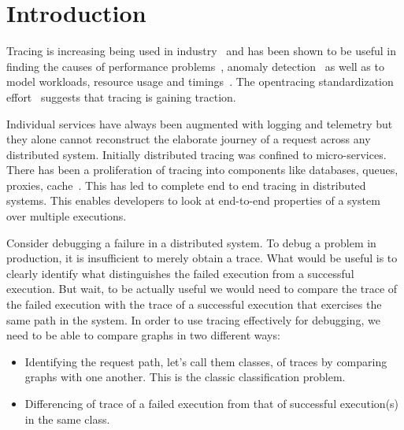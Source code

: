 \section{Introduction}
Tracing is increasing being used in industry~\cite{Jaeger, Zipkin, 36356} and has been shown to be useful in finding the causes of performance problems~\cite{36356, Fonseca:2007:XPN:1973430.1973450, Reynolds:2006:PDU:1267680.1267689, DBLP:conf/sigmetrics/ThereskaSSWALG06, Sambasivan:2011:DPC:1972457.1972463}, anomaly detection~\cite{Barham:2003:MOM:1251054.1251069, Chen:2004:PFE:1251175.1251198, 37477, Sambasivan:2011:DPC:1972457.1972463} as well as to model workloads, resource usage and timings~\cite{Mann:2011:MPE:2170444.2170464, Chanda:2007:WTP:1272996.1273001, 36356, DBLP:conf/sigmetrics/ThereskaSSWALG06, Barham:2003:MOM:1251054.1251069}.  The opentracing standardization effort~\cite{OpenTracing} suggests that tracing is gaining traction.

Individual services have always been augmented with logging and telemetry but they alone cannot reconstruct the elaborate journey of a request across any distributed system. Initially distributed tracing was confined to micro-services. There has been a proliferation of tracing into components like databases, queues, proxies, cache~\cite{OpenTracingCassandra, OpenTracingKafka, OpenTracingRedis}. This has led to complete end to end tracing in distributed systems. This enables developers to look at end-to-end properties of a system over multiple executions.

Consider debugging a failure in a distributed system. To debug a problem in production, it is insufficient to merely obtain a trace. What would be useful is to clearly identify what distinguishes the failed execution from a successful execution. But wait, to be actually useful we would need to compare the trace of the failed execution with the trace of a successful execution that exercises the same path in the system. In order to use tracing effectively for debugging, we need to be able to compare graphs in two different ways:
\begin{itemize}
\item Identifying the request path, let's call them classes, of traces by comparing graphs with one another. This is the classic classification problem.
\item Differencing of trace of a failed execution from that of successful execution(s) in the same class.
\end{itemize}

